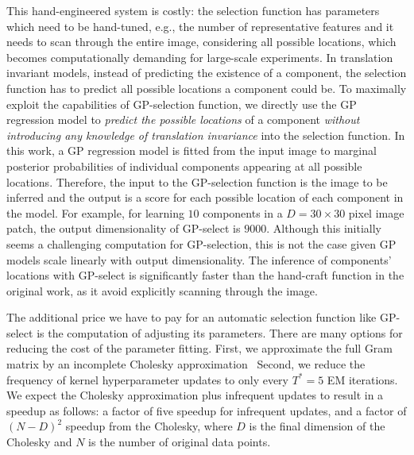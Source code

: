 This hand-engineered system is costly: the selection function has parameters which need to be hand-tuned, e.g., the number of representative features and %
it needs to scan through the entire image, considering all possible locations, which becomes computationally demanding for large-scale experiments.
%
In translation invariant models, instead of predicting the existence of a component, the selection function has to predict all possible locations a component could be.
To maximally exploit the capabilities of GP-selection function, we directly use the GP regression model to \textit{predict the possible locations} of a component \textit{without introducing any knowledge of translation invariance} into the selection function. In this work, a GP regression model is fitted from the input image to marginal posterior probabilities of individual components appearing at all possible locations. Therefore, the input to the GP-selection function is the image to be inferred and the output is a score for each possible location of each component in the model.
For example, for learning $10$ components in a $D=30\times 30$ pixel image patch, the output dimensionality of GP-select is $9000$.
Although this initially seems a challenging computation for GP-selection, this is not the case given GP models scale linearly with output dimensionality.
The inference of components' locations with GP-select is significantly faster than the hand-craft function in the original work, as it avoid explicitly scanning through the image.

The additional price we have to pay for an automatic selection function like GP-select is the computation of adjusting its parameters. %
There are many options for reducing the cost of the parameter fitting. 
First, we approximate the full Gram matrix by an incomplete Cholesky approximation~\cite{FinSch01}
%
Second, we reduce the frequency of kernel hyperparameter updates to only every $T^*=5$ EM iterations.
We expect the Cholesky approximation plus infrequent updates to result in a speedup as follows: a factor of five speedup for infrequent updates, and a factor of $(N-D)^2$ speedup from the Cholesky, where $D$ is the final dimension of the Cholesky and $N$ is the number of original data points.

